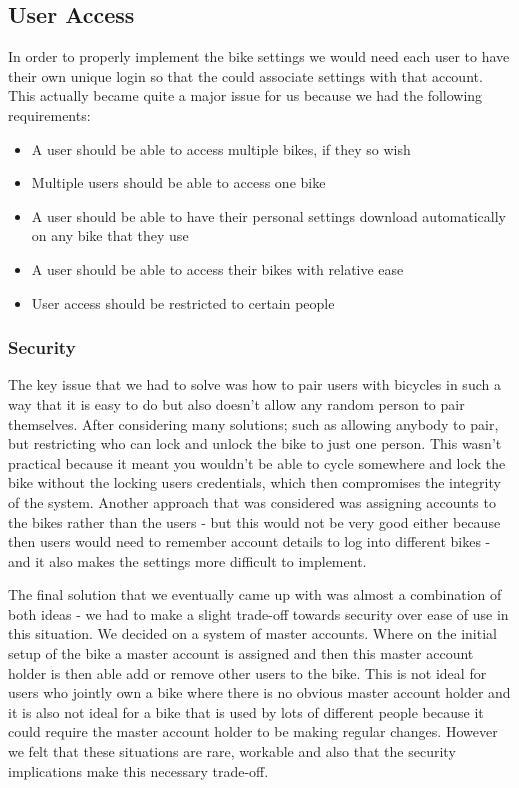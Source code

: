 \documentclass[a4paper]{report}
\begin{document}
{\subsection{User Access}
In order to properly implement the bike settings we would need each user to have their own unique login so that the could associate settings with that account. This actually became quite a major issue for us because we had the following requirements:

\begin{itemize}
\item A user should be able to access multiple bikes, if they so wish
\item Multiple users should be able to access one bike
\item A user should be able to have their personal settings download automatically on any bike that they use
\item A user should be able to access their bikes with relative ease
\item User access should be restricted to certain people
\end{itemize}

\subsubsection{Security}
The key issue that we had to solve was how to pair users with bicycles in such a way that it is easy to do but also doesn't allow any random person to pair themselves. After considering many solutions; such as allowing anybody to pair, but restricting who can lock and unlock the bike to just one person. This wasn't practical because it meant you wouldn't be able to cycle somewhere and lock the bike without the locking users credentials, which then compromises the integrity of the system. Another approach that was considered was assigning accounts to the bikes rather than the users - but this would not be very good either because then users would need to remember account details to log into different bikes - and it also makes the settings more difficult to implement.

The final solution that we eventually came up with was almost a combination of both ideas - we had to make a slight trade-off towards security over ease of use in this situation. We decided on a system of master accounts. Where on the initial setup of the bike a master account is assigned and then this master account holder is then able add or remove other users to the bike. This is not ideal for users who jointly own a bike where there is no obvious master account holder and it is also not ideal for a bike that is used by lots of different people because it could require the master account holder to be making regular changes. However we felt that these situations are rare, workable and also that the security implications make this necessary trade-off. 

}
\end{document}
